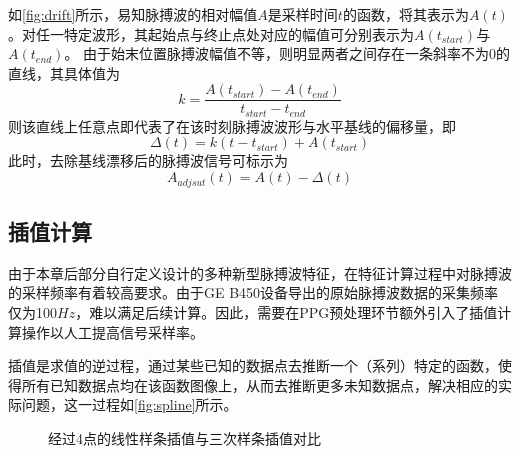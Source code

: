 如\autoref{fig:drift}所示，易知脉搏波的相对幅值$A$是采样时间$t$的函数，将其表示为$A(t)$。对任一特定波形，其起始点与终止点处对应的幅值可分别表示为$A(t_{start})$与$A(t_{end})$。
由于始末位置脉搏波幅值不等，则明显两者之间存在一条斜率不为0的直线，其具体值为
\begin{equation}
    \label{equ:linek}
    k=\frac{A(t_{start})-A(t_{end})}{t_{start}-t_{end}}
\end{equation}
则该直线上任意点即代表了在该时刻脉搏波波形与水平基线的偏移量，即
\begin{equation}
    \label{equ:liney}
    \Delta(t)=k(t-t_{start})+A(t_{start})
\end{equation}
此时，去除基线漂移后的脉搏波信号可标示为
\begin{equation}
    \label{equ:adjusta}
    A_{adjsut}(t)=A(t)-\Delta(t)
\end{equation}

\subsection{插值计算}
由于本章后部分自行定义设计的多种新型脉搏波特征，在特征计算过程中对脉搏波的采样频率有着较高要求。由于GE B450设备导出的原始脉搏波数据的采集频率仅为100$Hz$，难以满足后续计算。因此，需要在PPG预处理环节额外引入了插值计算操作以人工提高信号采样率。

插值是求值的逆过程，通过某些已知的数据点去推断一个（系列）特定的函数，使得所有已知数据点均在该函数图像上，从而去推断更多未知数据点，解决相应的实际问题，这一过程如\autoref{fig:spline}所示。
\begin{figure}[htbp]
    \centering
    \quad
    \caption{\label{fig:spline}经过4点的线性样条插值与三次样条插值对比}
\end{figure}


